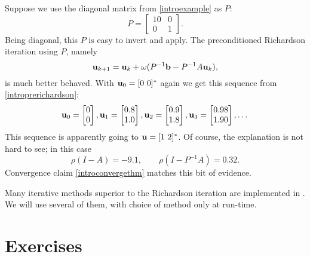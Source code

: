 \medskip\noindent\hrulefill
\begin{examplecont}  Suppose we use the diagonal matrix from  \eqref{introexample} as $P$:
\begin{equation}
P = \begin{bmatrix}
10 & 0 \\ 0 & 1
\end{bmatrix}.  \label{introP}
\end{equation}
Being diagonal, this $P$ is easy to invert and apply.  The preconditioned Richardson iteration using $P$, namely
\begin{equation}
\mathbf{u}_{k+1} = \mathbf{u}_k + \omega (P^{-1} \mathbf{b} - P^{-1} A \mathbf{u}_k),  \label{introprerichardson}
\end{equation}
is much better behaved.  With $\mathbf{u}_0 = [0\,\, 0]^*$ again we get this sequence from \eqref{introprerichardson}:
\begin{equation}
\mathbf{u}_{0} = \begin{bmatrix} 0 \\ 0 \end{bmatrix}, \mathbf{u}_{1} = \begin{bmatrix} 0.8 \\ 1.0 \end{bmatrix}, \mathbf{u}_{2} = \begin{bmatrix} 0.9 \\ 1.8 \end{bmatrix}, \mathbf{u}_{3} = \begin{bmatrix} 0.98 \\ 1.90 \end{bmatrix}, \dots
\end{equation}
This sequence is apparently going to $\mathbf{u} = [1\,\, 2]^*$.  Of course, the explanation is not hard to see; in this case
\begin{equation}
\rho(I-A) = -9.1, \qquad \rho(I-P^{-1} A) = 0.32.
\end{equation}
Convergence claim \eqref{introconvergethm} matches this bit of evidence.
\end{examplecont}
\noindent\hrulefill

Many iterative methods superior to the Richardson iteration are implemented in \PETSc.  We will use several of them, with choice of method only at run-time.




\section{Exercises}

